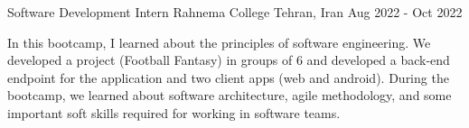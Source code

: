 \begin{cventries}
  \cventry
  {Software Development Intern}
  {Rahnema College}
  {Tehran, Iran}
  {Aug 2022 - Oct 2022}
  {
    \begin{cvitems}
      \item{In this bootcamp, I learned about the principles of software engineering. We developed a project (Football Fantasy) in groups of 6 and developed a back-end endpoint for the application and two client apps (web and android). During the bootcamp, we learned about software architecture, agile methodology, and some important soft skills required for working in software teams.}
    \end{cvitems}
  }

\end{cventries}
